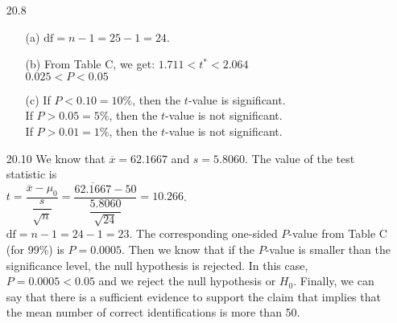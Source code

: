 \documentclass[11pt, a4paper]{article}
\begin{document}
\begin{itemize}
\item[]
\item[]

\item[20.8]
\begin{itemize}
\item[(a)]
$\text{df} = n - 1 = 25 - 1 = 24$.

\item[]

\item[(b)]
From Table C, we get:
$1.711 < t^* < 2.064$\\
$0.025 < P < 0.05$
\item[]

\item[(c)]
If $P < 0.10 = 10\%$, then the $t$-value is significant.\\
If $P > 0.05 = 5\%$, then the $t$-value is not significant.\\
If $P > 0.01 = 1\%$, then the $t$-value is not significant.
\end{itemize}

\item[]
\item[]

\item[20.10]
We know that $\overline{x} = 62.1667$ and $s = 5.8060$.
The value of the test statistic is
\vspace{0.35cm}\\
$t = \dfrac{\overline{x} - \mu_0}{\dfrac{s}{\sqrt{n}}} = \dfrac{\overline{62.1667} - 50}{\dfrac{5.8060}{\sqrt{24}}} = 10.266$.
\vspace{0.35cm}\\
$\text{df} = n - 1 = 24 - 1 = 23$. The corresponding one-sided $P$-value from Table C (for 99\%)
is $P = 0.0005$. Then we know that if the $P$-value is smaller than the significance level, the null
hypothesis is rejected. In this case, $P = 0.0005 < 0.05$ and we reject the null hypothesis or $H_0$.
Finally, we can say that there is a sufficient evidence to support the claim that implies that the
mean number of correct identifications is more than 50.

\newpage


\end{itemize}
\end{document}
